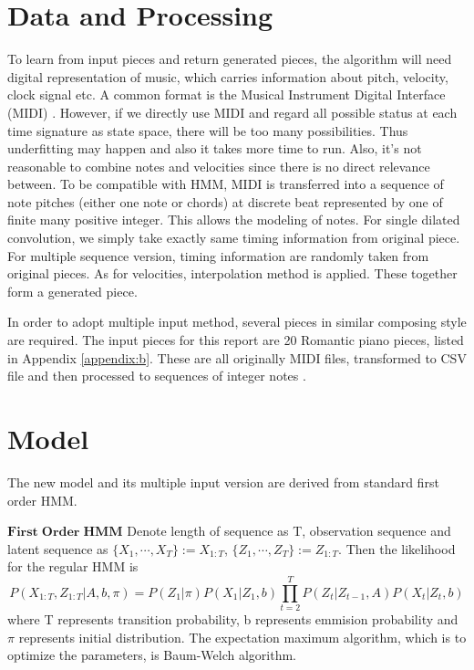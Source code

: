 \documentclass[10pt, oneside]{article}
\begin{document}
\section{Data and Processing}
To learn from input pieces and return generated pieces, the algorithm will need digital representation of music, which carries information about pitch, velocity, clock signal etc. A common format is the Musical Instrument Digital Interface (MIDI) \cite{midiwiki}. However, if we directly use MIDI and regard all possible status at each time signature as state space, there will be too many possibilities. Thus underfitting may happen and also it takes more time to run. Also, it's not reasonable to combine notes and velocities since there is no direct relevance between. To be compatible with HMM, MIDI is transferred into a sequence of note pitches (either one note or chords) at discrete beat represented by one of finite many positive integer. This allows the modeling of notes. For single dilated convolution, we simply take exactly same timing information from original piece. For multiple sequence version, timing information are randomly taken from original pieces. As for velocities, interpolation method is applied. These together form a generated piece.

In order to adopt multiple input method, several pieces in similar composing style are required. 
The input pieces for this report are 20 Romantic piano pieces, listed in Appendix \ref{appendix:b}. These are all originally MIDI files, transformed to CSV file  \cite{midicsv} and then processed to sequences of integer notes \cite{annagithub}. 
\section{Model}
The new model and its multiple input version are derived from standard first order HMM.


$\mathbf{First \;Order\;HMM}$
Denote length of sequence as T, observation sequence and latent sequence as $\{ X_1,\cdots, X_T\}:=X_{1:T}$, $\{ Z_1,\cdots, Z_T\}:=Z_{1:T}$. Then the likelihood for the regular HMM is
$$
P\left(X_{1: T}, Z_{1: T}| A, b, \pi \right)=P\left(Z_{1}| \pi \right) P\left(X_{1} | Z_{1}, b \right) \prod_{t=2}^{T} P\left(Z_{t} | Z_{t-1}, A\right) P\left(X_{t} | Z_{t},b\right)
$$
where T represents transition probability, b represents emmision probability and $\pi$ represents initial distribution. The expectation maximum algorithm, which is to optimize the parameters, is Baum-Welch algorithm.\cite{tutorial}\\
\end{document}
